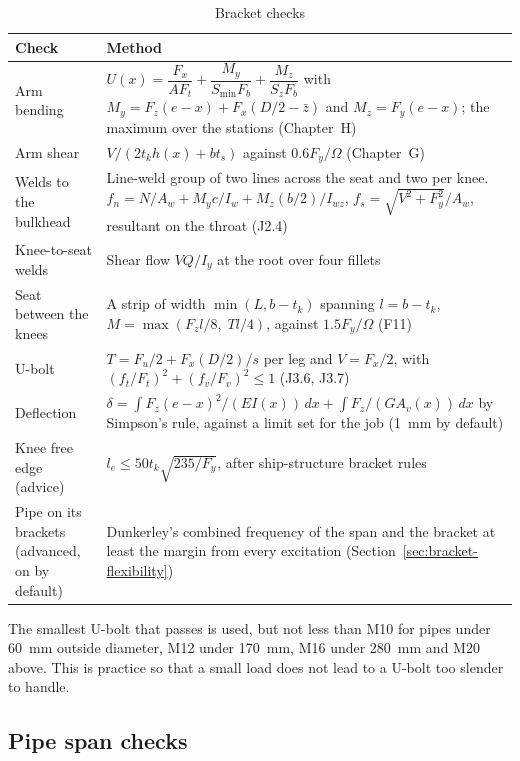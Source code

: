 \begin{table}[H]
\centering
\caption{Bracket checks}
\label{tab:bracket-checks}
\small
\begin{tabularx}{\textwidth}{>{\raggedright\arraybackslash}p{}X}
\toprule
\textbf{Check} & \textbf{Method}\\
\midrule
Arm bending & $U(x) = \dfrac{F_x}{A F_t} + \dfrac{M_y}{S_\text{min} F_b} + \dfrac{M_z}{S_z F_b}$ with $M_y = F_z(e-x) + F_x(D/2 - \bar z)$ and $M_z = F_y(e-x)$; the maximum over the stations (Chapter~H)\\
Arm shear & $V/(2t_k h(x) + b t_s)$ against $0.6F_y/\Omega$ (Chapter~G)\\
Welds to the bulkhead & Line-weld group of two lines across the seat and two per knee. $f_n = N/A_w + M_y c/I_w + M_z(b/2)/I_{wz}$, $f_s = \sqrt{V^2 + F_y^2}/A_w$, resultant on the throat (J2.4)\\
Knee-to-seat welds & Shear flow $VQ/I_y$ at the root over four fillets\\
Seat between the knees & A strip of width $\min(L, b - t_k)$ spanning $l = b - t_k$, $M = \max(F_z l/8,\; T l/4)$, against $1.5F_y/\Omega$ (F11)\\
U-bolt & $T = F_u/2 + F_x(D/2)/s$ per leg and $V = F_x/2$, with $(f_t/F_t)^2 + (f_v/F_v)^2 \leq 1$ (J3.6, J3.7)\\
Deflection & $\delta = \int F_z(e-x)^2/(EI(x))\,dx + \int F_z/(GA_v(x))\,dx$ by Simpson's rule, against a limit set for the job (1~mm by default)\\
Knee free edge (advice) & $l_e \leq 50t_k\sqrt{235/F_y}$, after ship-structure bracket rules\\
Pipe on its brackets (advanced, on by default) & Dunkerley's combined frequency of the span and the bracket at least the margin from every excitation (Section~\ref{sec:bracket-flexibility})\\
\bottomrule
\end{tabularx}
\end{table}

The smallest U-bolt that passes is used, but not less than M10 for pipes under
60~mm outside diameter, M12 under 170~mm, M16 under 280~mm and M20 above. This
is \NEMO{} practice so that a small load does not lead to a U-bolt too slender
to handle.

\subsection{Pipe span checks}
\label{sec:pipe-span}

